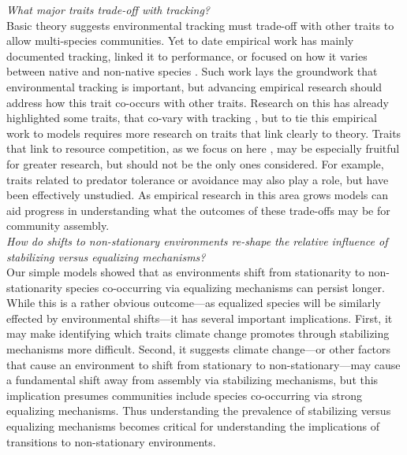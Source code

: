 \documentclass[11pt,letterpaper]{article}
\begin{document}
\emph{What major traits trade-off with tracking?} \\

Basic theory suggests environmental tracking must trade-off with other traits to allow multi-species communities. Yet to date empirical work has mainly documented tracking, linked it to performance, or focused on how it varies between native and non-native species \citep{Willis:2010al,wolkovichAmBot2013,Zettlemoyer2019}. Such work lays the groundwork that environmental tracking is important, but advancing empirical research should address how this trait co-occurs with other traits. Research on this has already highlighted some traits, that co-vary with tracking \citep[e.g.,][]{kharouba2014,lasky2016,Zhu2016BioLetters}, but to tie this empirical work to models requires more research on traits that link clearly to theory. Traits that link to resource competition, as we focus on here \citep[as others have as well, see][]{volkerass}, may be especially fruitful for greater research, but should not be the only ones considered. For example, traits related to predator tolerance or avoidance may also play a role, but have been effectively unstudied.  As empirical research in this area grows models can aid progress in understanding what the outcomes of these trade-offs may be for community assembly.\\ 

\emph{How do shifts to non-stationary environments re-shape the relative influence of stabilizing versus equalizing mechanisms?} \\

Our simple models showed that as environments shift from stationarity to non-stationarity species co-occurring via equalizing mechanisms can persist longer. While this is a rather obvious outcome---as equalized species will be similarly effected by environmental shifts---it has several important implications. First, it may make identifying which traits climate change promotes through stabilizing mechanisms more difficult. Second, it suggests climate change---or other factors that cause an environment to shift from stationary to non-stationary---may cause a fundamental shift away from assembly via stabilizing mechanisms, but this implication presumes communities include species co-occurring via strong equalizing mechanisms. Thus understanding the prevalence of stabilizing versus equalizing mechanisms \citep[which ecology has worked on for many decades,][]{Caswell:1976np,Gravel:2006ax,Chesson:2000vd} becomes critical for understanding the implications of transitions to non-stationary environments. 
\end{document}

